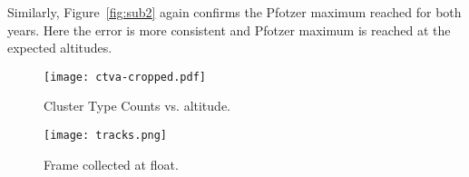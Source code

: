 Similarly, Figure~\ref{fig:sub2} again confirms the Pfotzer maximum reached for both years.  Here the error is more consistent and Pfotzer maximum is reached at the expected altitudes.

\begin{figure}[H]
\centering
\texttt{[image: ctva-cropped.pdf]}
\caption{Cluster Type Counts vs. altitude.}
\end{figure}

\begin{figure}[H]
\centering
\texttt{[image: tracks.png]}
\caption{Frame collected at float.}
\end{figure}

